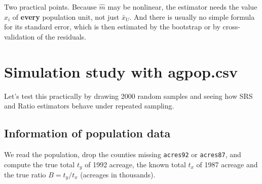 \documentclass[
  letterpaper,
  DIV=11,
  numbers=noendperiod]{scrreprt}
\newenvironment{Shaded}{\begin{snugshade}}{\end{snugshade}}
\newcommand{\CommentTok}[1]{\textcolor[rgb]{0.37,0.37,0.37}{#1}}
\newcommand{\DecValTok}[1]{\textcolor[rgb]{0.68,0.00,0.00}{#1}}
\newcommand{\DocumentationTok}[1]{\textcolor[rgb]{0.37,0.37,0.37}{\textit{#1}}}
\newcommand{\FunctionTok}[1]{\textcolor[rgb]{0.28,0.35,0.67}{#1}}
\newcommand{\NormalTok}[1]{\textcolor[rgb]{0.00,0.23,0.31}{#1}}
\newcommand{\OtherTok}[1]{\textcolor[rgb]{0.00,0.23,0.31}{#1}}
\newcommand{\SpecialCharTok}[1]{\textcolor[rgb]{0.37,0.37,0.37}{#1}}
\newcommand{\StringTok}[1]{\textcolor[rgb]{0.13,0.47,0.30}{#1}}
\renewcommand{\[}{\begin{equation}}
\renewcommand{\]}{\end{equation}}
\begin{document}
Two practical points. Because \(\hat m\) may be nonlinear, the estimator
needs the value \(x_i\) of \textbf{every} population unit, not just
\(\bar x_U\). And there is usually no simple formula for its standard
error, which is then estimated by the bootstrap or by cross-validation
of the residuals.

\section{Simulation study with
agpop.csv}\label{simulation-study-with-agpop.csv}

Let's test this practically by drawing 2000 random samples and seeing
how SRS and Ratio estimators behave under repeated sampling.

\subsection{Information of population
data}\label{information-of-population-data}

We read the population, drop the counties missing \texttt{acres92} or
\texttt{acres87}, and compute the true total \(t_y\) of 1992 acreage,
the known total \(t_x\) of 1987 acreage and the true ratio
\(B = t_y/t_x\) (acreages in thousands).

\begin{Shaded}
\end{Shaded}
\end{document}
